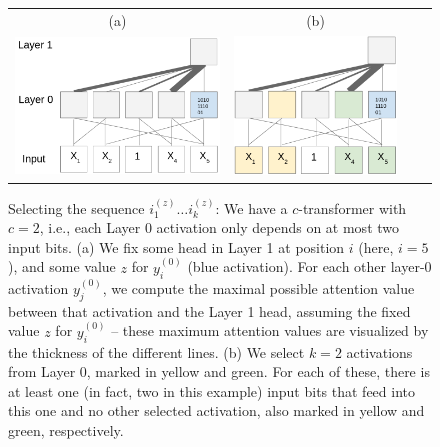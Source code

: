\documentclass[11pt,a4paper]{article}
\begin{document}
\begin{figure}[ht]
    \centering
    \begin{tabular}{cccc}
    (a) & (b) \\
    \includegraphics[height=0.1\textheight]{figures/select-1.png} &
        \includegraphics[height=0.1\textheight]{figures/select-2.png}&
        \end{tabular}
	\caption{Selecting the sequence $i_{1}^{(z)} \dots i_{k}^{(z)}$: We have a $c$-transformer with $c=2$, i.e., each Layer 0 activation only depends on at most two input bits.
	(a)  We fix some head in Layer 1 at position $i$ (here, $i=5$), and some value $z$ for $y^{(0)}_i$ (blue activation). For each other layer-0 activation $y^{(0)}_j$, we compute the maximal possible attention value between that activation and the Layer 1 head, assuming the fixed value $z$ for $y^{(0)}_i$ -- these maximum attention values are visualized by the thickness of the different lines.
	(b) We select $k = 2$ activations from Layer 0, marked in yellow and green. For each of these, there is at least one (in fact, two in this example) input bits that feed into this one and no other selected activation, also marked in yellow and green, respectively.}
	\label{fig:selecting}
\end{figure}
\end{document}

